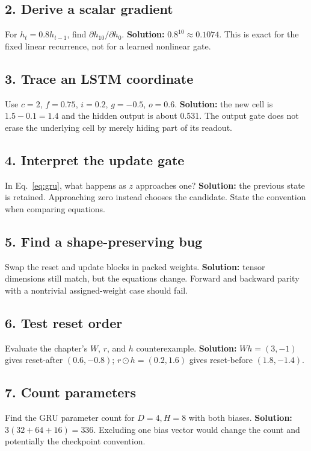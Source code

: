 \subsection*{2. Derive a scalar gradient}
For $h_t=0.8h_{t-1}$, find $\partial h_{10}/\partial h_0$.
\textbf{Solution:} $0.8^{10}\approx0.1074$. This is exact for the fixed
linear recurrence, not for a learned nonlinear gate.

\subsection*{3. Trace an LSTM coordinate}
Use $c=2$, $f=0.75$, $i=0.2$, $g=-0.5$, $o=0.6$.
\textbf{Solution:} the new cell is $1.5-0.1=1.4$ and the hidden output
is about 0.531. The output gate does not erase the underlying cell by
merely hiding part of its readout.

\subsection*{4. Interpret the update gate}
In Eq.~\ref{eq:gru}, what happens as $z$ approaches one?
\textbf{Solution:} the previous state is retained. Approaching zero
instead chooses the candidate. State the convention when comparing equations.

\subsection*{5. Find a shape-preserving bug}
Swap the reset and update blocks in packed weights.
\textbf{Solution:} tensor dimensions still match, but the equations change.
Forward and backward parity with a nontrivial assigned-weight case should fail.

\subsection*{6. Test reset order}
Evaluate the chapter's $W$, $r$, and $h$ counterexample.
\textbf{Solution:} $Wh=(3,-1)$ gives reset-after $(0.6,-0.8)$;
$r\odot h=(0.2,1.6)$ gives reset-before $(1.8,-1.4)$.

\subsection*{7. Count parameters}
Find the GRU parameter count for $D=4,H=8$ with both biases.
\textbf{Solution:} $3(32+64+16)=336$. Excluding one bias vector would
change the count and potentially the checkpoint convention.

